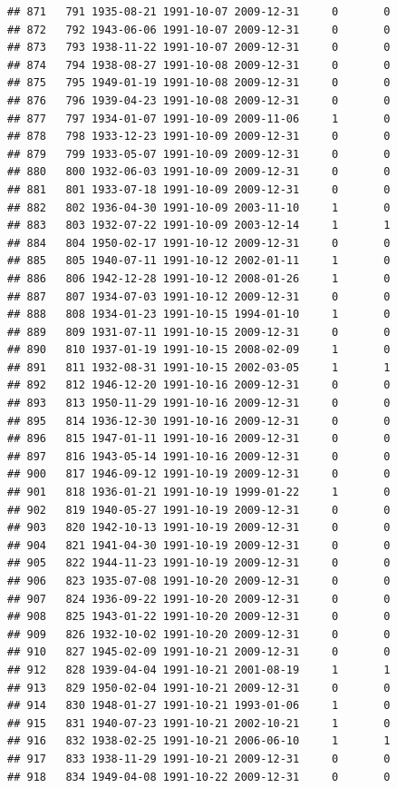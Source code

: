 \documentclass[
]{book}
\theoremstyle{definition}
\theoremstyle{definition}
\theoremstyle{definition}
\theoremstyle{definition}
\theoremstyle{remark}
\begin{document}
\begin{verbatim}
## 871   791 1935-08-21 1991-10-07 2009-12-31     0       0
## 872   792 1943-06-06 1991-10-07 2009-12-31     0       0
## 873   793 1938-11-22 1991-10-07 2009-12-31     0       0
## 874   794 1938-08-27 1991-10-08 2009-12-31     0       0
## 875   795 1949-01-19 1991-10-08 2009-12-31     0       0
## 876   796 1939-04-23 1991-10-08 2009-12-31     0       0
## 877   797 1934-01-07 1991-10-09 2009-11-06     1       0
## 878   798 1933-12-23 1991-10-09 2009-12-31     0       0
## 879   799 1933-05-07 1991-10-09 2009-12-31     0       0
## 880   800 1932-06-03 1991-10-09 2009-12-31     0       0
## 881   801 1933-07-18 1991-10-09 2009-12-31     0       0
## 882   802 1936-04-30 1991-10-09 2003-11-10     1       0
## 883   803 1932-07-22 1991-10-09 2003-12-14     1       1
## 884   804 1950-02-17 1991-10-12 2009-12-31     0       0
## 885   805 1940-07-11 1991-10-12 2002-01-11     1       0
## 886   806 1942-12-28 1991-10-12 2008-01-26     1       0
## 887   807 1934-07-03 1991-10-12 2009-12-31     0       0
## 888   808 1934-01-23 1991-10-15 1994-01-10     1       0
## 889   809 1931-07-11 1991-10-15 2009-12-31     0       0
## 890   810 1937-01-19 1991-10-15 2008-02-09     1       0
## 891   811 1932-08-31 1991-10-15 2002-03-05     1       1
## 892   812 1946-12-20 1991-10-16 2009-12-31     0       0
## 893   813 1950-11-29 1991-10-16 2009-12-31     0       0
## 895   814 1936-12-30 1991-10-16 2009-12-31     0       0
## 896   815 1947-01-11 1991-10-16 2009-12-31     0       0
## 897   816 1943-05-14 1991-10-16 2009-12-31     0       0
## 900   817 1946-09-12 1991-10-19 2009-12-31     0       0
## 901   818 1936-01-21 1991-10-19 1999-01-22     1       0
## 902   819 1940-05-27 1991-10-19 2009-12-31     0       0
## 903   820 1942-10-13 1991-10-19 2009-12-31     0       0
## 904   821 1941-04-30 1991-10-19 2009-12-31     0       0
## 905   822 1944-11-23 1991-10-19 2009-12-31     0       0
## 906   823 1935-07-08 1991-10-20 2009-12-31     0       0
## 907   824 1936-09-22 1991-10-20 2009-12-31     0       0
## 908   825 1943-01-22 1991-10-20 2009-12-31     0       0
## 909   826 1932-10-02 1991-10-20 2009-12-31     0       0
## 910   827 1945-02-09 1991-10-21 2009-12-31     0       0
## 912   828 1939-04-04 1991-10-21 2001-08-19     1       1
## 913   829 1950-02-04 1991-10-21 2009-12-31     0       0
## 914   830 1948-01-27 1991-10-21 1993-01-06     1       0
## 915   831 1940-07-23 1991-10-21 2002-10-21     1       0
## 916   832 1938-02-25 1991-10-21 2006-06-10     1       1
## 917   833 1938-11-29 1991-10-21 2009-12-31     0       0
## 918   834 1949-04-08 1991-10-22 2009-12-31     0       0

\end{verbatim}
\end{document}
